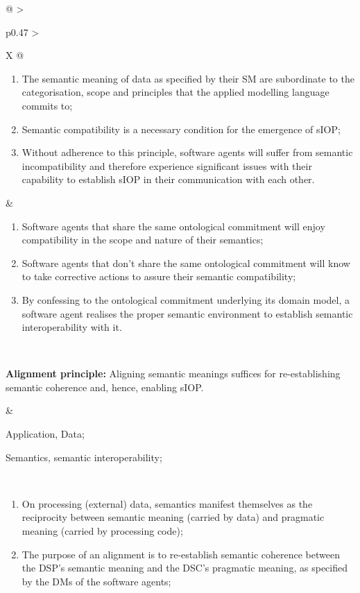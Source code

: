 \begin{xltabular}[l]{\linewidth}{@{} >{\small\raggedright\arraybackslash}p{0.47\linewidth} >{\small\raggedright\arraybackslash}X @{}}
\begin{enumerate}[left=6pt, nosep]
  \item The semantic meaning of data as specified by their SM are subordinate to the categorisation, scope and principles that the applied modelling language commits to; 
  \item Semantic compatibility is a necessary condition for the emergence of sIOP; 
  \item Without adherence to this principle, software agents will suffer from semantic incompatibility and therefore experience significant issues with their capability to establish sIOP in their communication with each other.
\end{enumerate}
&
\begin{enumerate}[left=10pt, nosep]
  \item Software agents that share the same ontological commitment will enjoy compatibility in the scope and nature of their semantics;
  \item Software agents that don't share the same ontological commitment will know to take corrective actions to assure their semantic compatibility;
  \item By confessing to the ontological commitment underlying its domain model, a software agent realises the proper semantic environment to establish semantic interoperability with it.
\end{enumerate} \\
%
%
%
\begin{mmdp}\label{dp:alignment}{\bfseries Alignment principle:}
\quad Aligning semantic meanings suffices for re-establishing semantic coherence and, hence, enabling sIOP. \end{mmdp}
&
\begin{description}[labelwidth=3.7cm,leftmargin=3.7cm+1ex,nosep,topsep=2ex,labelsep=1ex,font=\bfseries]
  \item[Type of information:] Application, Data;
  \item[Quality attributes:] Semantics, semantic interoperability;
\end{description}\\
\begin{enumerate}[left=6pt, nosep]
  \item On processing (external) data, semantics manifest themselves as the reciprocity between semantic meaning (carried by data) and pragmatic meaning (carried by processing code);
  \item The purpose of an alignment is to re-establish semantic coherence between the DSP's semantic meaning and the DSC's pragmatic meaning, as specified by the DMs of the software agents;

\end{enumerate}
\end{xltabular}
